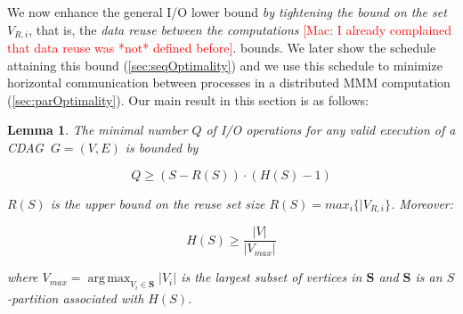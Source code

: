 \documentclass[sigplan,review,anonymous]{acmart}\settopmatter{printfolios=true,printccs=false,printacmref=false}
\newcommand\mac[1]{\textcolor{red}{[Mac: #1]}}
\DeclareMathOperator*{\argmax}{arg\,max}
\newtheorem{lma}{Lemma}
\newcommand{\macb}[1]{\textbf{\textsf{#1}}}
\begin{document}
We now enhance the general I/O lower bound \emph{by tightening the bound on the
	set $V_{R,i}$}, that is, the \emph{data reuse between the computations} 
	\mac{I
	already complained that data reuse was *not* defined before}. 
%
bounds. We later show the schedule attaining this bound
(\cref{sec:seqOptimality}) and we use this schedule to minimize horizontal
communication between processes in a distributed MMM computation
(\cref{sec:parOptimality}). 
%
%
%
%
%
Our main result in this section is as follows:

\begin{lma}
	\label{lma:reuse}
	The minimal number $Q$ of I/O operations for any valid execution of a CDAG 
	$\ G=(V,E)$ is bounded by  
	
	\vspace{-0.5em}
	\begin{equation}
	Q \ge (S - R(S)) \cdot (H(S) - 1)
	\label{eq:reusebound} \end{equation}
	\vspace{-0.5em}
	
	\noindent
	$R(S)$ is the upper bound on the reuse set size $R(S) = max_i\{|V_{R,i}\}$. 
	Moreover: 
	
	\vspace{-0.5em}
	\begin{equation}\label{eq:reusebound-pmax}
	H(S) \ge \frac{|V|}{|V_{max}|}
	\end{equation}
	\vspace{-0.5em}
	
	\noindent
	where $V_{max} = \argmax_{V_i \in \mathcal{\mathbf{S}}}|V_i|$ is the largest
	subset of vertices in $\mathcal{\mathbf{S}}$ and $\mathcal{\mathbf{S}}$ is 
	an
	$S$-partition associated with $H(S)$.
	
\end{lma}
\end{document}
